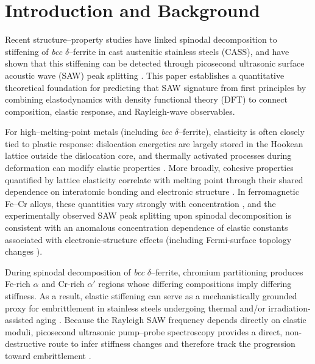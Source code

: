 \documentclass[final,3p,times]{elsarticle}
\begin{document}
\section{Introduction and Background}
Recent structure--property studies have linked spinodal decomposition to stiffening of \textit{bcc} $\delta$--ferrite in cast austenitic stainless steels (CASS), and have shown that this stiffening can be detected through picosecond ultrasonic surface acoustic wave (SAW) peak splitting \cite{al2023detecting, al2020detecting,al2020non}.
This paper establishes a quantitative theoretical foundation for predicting that SAW signature from first principles by combining elastodynamics with density functional theory (DFT) to connect composition, elastic response, and Rayleigh-wave observables.

For high--melting-point metals (including \textit{bcc} $\delta$--ferrite), elasticity is often closely tied to plastic response: dislocation energetics are largely stored in the Hookean lattice outside the dislocation core, and thermally activated processes during deformation can modify elastic properties \cite{pugh1954xcii}.
More broadly, cohesive properties quantified by lattice elasticity correlate with melting point through their shared dependence on interatomic bonding and electronic structure \cite{chang1966correlation,fine1984elastic, korzhavyi2009electronic, razumovskiy2011first, hosemann2018materials}.
In ferromagnetic Fe--Cr alloys, these quantities vary strongly with concentration \cite{korzhavyi2009electronic}, and the experimentally observed SAW peak splitting upon spinodal decomposition is consistent with an anomalous concentration dependence of elastic constants associated with electronic-structure effects (including Fermi-surface topology changes \cite{razumovskiy2011first}).

During spinodal decomposition of \textit{bcc} $\delta$--ferrite, chromium partitioning produces Fe-rich $\alpha$ and Cr-rich $\alpha'$ regions whose differing compositions imply differing stiffness. As a result, elastic stiffening can serve as a mechanistically grounded proxy for embrittlement in stainless steels undergoing thermal and/or irradiation-assisted aging \cite{du2017facile, sdajani2019cassspinodal,al2020non, hofmann2019transient, al2020detecting,byun2016thermal,lach2020precipitation}.
Because the Rayleigh SAW frequency depends directly on elastic moduli, picosecond ultrasonic pump--probe spectroscopy provides a direct, non-destructive route to infer stiffness changes and therefore track the progression toward embrittlement \cite{hofmann2019transient}.
\end{document}
